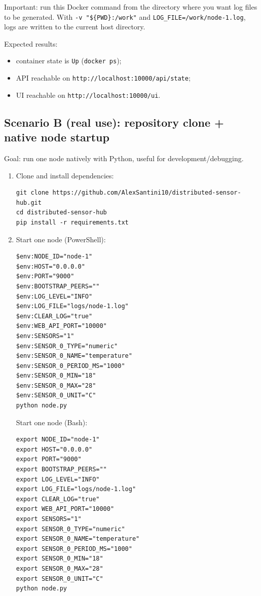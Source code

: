 Important: run this Docker command from the directory where you want log files to be generated. With \texttt{-v "\$\{PWD\}:/work"} and \texttt{LOG\_FILE=/work/node-1.log}, logs are written to the current host directory.

Expected results:
\begin{itemize}
  \item container state is \texttt{Up} (\texttt{docker ps});
  \item API reachable on \texttt{http://localhost:10000/api/state};
  \item UI reachable on \texttt{http://localhost:10000/ui}.
\end{itemize}

\subsection{Scenario B (real use): repository clone + native node startup}

Goal: run one node natively with Python, useful for development/debugging.

\begin{enumerate}
  \item Clone and install dependencies:
\begin{verbatim}
git clone https://github.com/AlexSantini10/distributed-sensor-hub.git
cd distributed-sensor-hub
pip install -r requirements.txt
\end{verbatim}
  \item Start one node (PowerShell):
\begin{verbatim}
$env:NODE_ID="node-1"
$env:HOST="0.0.0.0"
$env:PORT="9000"
$env:BOOTSTRAP_PEERS=""
$env:LOG_LEVEL="INFO"
$env:LOG_FILE="logs/node-1.log"
$env:CLEAR_LOG="true"
$env:WEB_API_PORT="10000"
$env:SENSORS="1"
$env:SENSOR_0_TYPE="numeric"
$env:SENSOR_0_NAME="temperature"
$env:SENSOR_0_PERIOD_MS="1000"
$env:SENSOR_0_MIN="18"
$env:SENSOR_0_MAX="28"
$env:SENSOR_0_UNIT="C"
python node.py
\end{verbatim}
  Start one node (Bash):
\begin{verbatim}
export NODE_ID="node-1"
export HOST="0.0.0.0"
export PORT="9000"
export BOOTSTRAP_PEERS=""
export LOG_LEVEL="INFO"
export LOG_FILE="logs/node-1.log"
export CLEAR_LOG="true"
export WEB_API_PORT="10000"
export SENSORS="1"
export SENSOR_0_TYPE="numeric"
export SENSOR_0_NAME="temperature"
export SENSOR_0_PERIOD_MS="1000"
export SENSOR_0_MIN="18"
export SENSOR_0_MAX="28"
export SENSOR_0_UNIT="C"
python node.py
\end{verbatim}
\end{enumerate}

